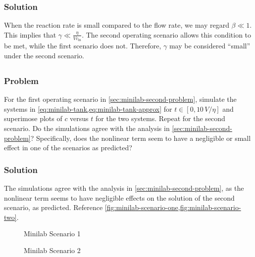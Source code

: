 \documentclass[12pt,twoside]{article}
\begin{document}
\subsubsection*{Solution}
When the reaction rate is small compared to the flow rate, we may regard $\beta
\ll 1$. This implies that $\gamma \ll \frac{\eta}{Vc_\text{in}}$. The second
operating scenario allows this condition to be met, while the first scenario
does not. Therefore, $\gamma$ may be considered ``small'' under the second
scenario.

\subsection{}
\subsubsection*{Problem}
For the first operating scenario in \cref{sec:minilab-second-problem}, simulate
the systems in \cref{eq:minilab-tank,eq:minilab-tank-approx} for
$t\in[0,10\,V/\eta]$ and superimose plots of $c$ versus $t$ for the two systems.
Repeat for the second scenario. Do the simulations agree with the analysis in
\cref{sec:minilab-second-problem}? Specifically, does the nonlinear term seem
to have a negligible or small effect in one of the scenarios as predicted?

\subsubsection*{Solution}
The simulations agree with the analysis in \cref{sec:minilab-second-problem}, as
the nonlinear term seems to have negligible effects on the solution of the
second scenario, as predicted. Reference
\cref{fig:minilab-scenario-one,fig:minilab-scenario-two}.

\begin{figure}
  \centering
  \caption{Minilab Scenario 1}
  \label{fig:minilab-scenario-one}
\end{figure}

\begin{figure}
  \centering
  \caption{Minilab Scenario 2}
  \label{fig:minilab-scenario-two}
\end{figure}
\end{document}
